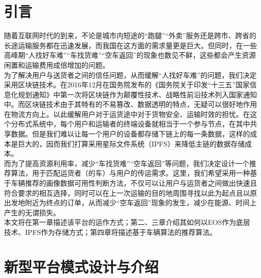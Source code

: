 \documentclass[UTF8]{ctexart}
\begin{document}
\begin{multicols}{2}
  \setcounter{section}{-1}
  \section{引言}
    随着互联网时代的到来，不论是城市内短途的“跑腿”“外卖”服务还是跨市、跨省的长途运输服务都在迅速发展，而我国在这方面的需求量更是巨大。但同时，在一些高峰期“人找好车难”“车找货难”“空车返回”的现象也数见不鲜，这些都会产生资源闲置和运输费用成倍增加的问题。\\
    \indent 为了解决用户与送货者之间的信任问题，从而缓解“人找好车难”的问题，我们决定采用区块链技术。在2016年12月在国务院发布的《国务院关于印发“十三五”国家信息化规划通知》中第一次将区块链作为颠覆性技术、战略性前沿技术列入国家通知中\cite{ref1}。而区块链技术由于其特有的不易篡改、数据透明的特点，无疑可以很好地作用在物流方向上。以此缓解用户对于运货途中对于货物安全、运输时效的担忧。在这个分布式系统中，每个用户和运输者的终端设备就相当于一个参与节点，在其中共享数据。但是我们难以让每一个用户的设备都存储下链上的每一条数据，这样的成本是巨大的，因而我们打算采用星际文件系统（IPFS）来降低主链的数据存储成本。\\
    \indent 而为了提高资源利用率，减少“车找货难”“空车返回”等问题，我们决定设计一个推荐算法，用于匹配运货者（的车）与用户的传运需求。这里，我们希望采用一种基于车辆推荐的画像数据可用性判断方法\cite{ref2}，不仅可以让用户与运货者之间做出快速且符合要求的相互选择，同时可以在上一次运输的目的地周围寻找以此为起点且以原出发地附近为终点的订单，从而减少“空车返回”现象的发生，减少在能源、时间上产生的无谓损失。\\
    \indent 本文将在第一章描述该平台的运作方式；第二、三章介绍其如何以EOS作为底层技术、IPFS作为存储方式；第四章将描述基于车辆算法的推荐算法。
  \section{新型平台模式设计与介绍}

\end{multicols}
\end{document}
